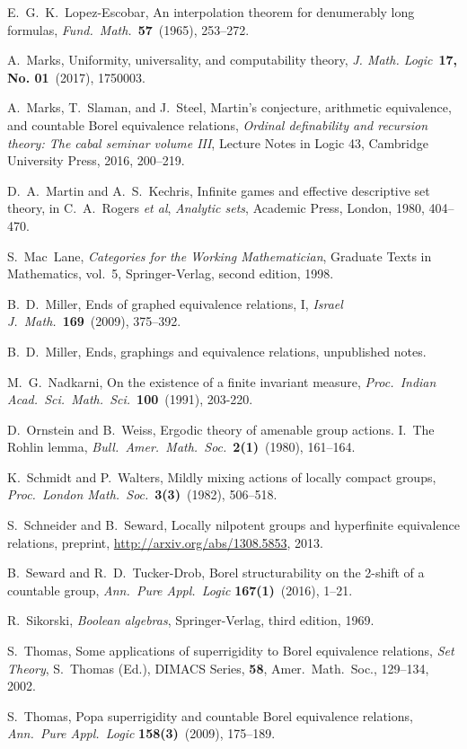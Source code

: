 \documentclass[11pt]{article}
\begin{document}
\begin{thebibliography}{00000}
  E.~G.~K.~Lopez-Escobar, An interpolation theorem for denumerably long formulas, \emph{Fund.\ Math.}\ \textbf{57}~(1965), 253--272.

  A.~Marks, Uniformity, universality, and computability theory, \emph{J. Math. Logic}\ \textbf{17, No. 01}~(2017), 1750003.


  A.~Marks, T.~Slaman, and J.~Steel, Martin's conjecture, arithmetic equivalence, and countable Borel equivalence relations, \emph{Ordinal definability and recursion theory: The cabal seminar volume III}, Lecture Notes in Logic 43, Cambridge University Press, 2016, 200--219.

  D.~A.~Martin and A.~S.~Kechris, Infinite games and effective descriptive set theory, in C.~A.~Rogers \emph{et al}, \emph{Analytic sets}, Academic Press, London, 1980, 404--470.

  S.~Mac~Lane, \emph{Categories for the Working Mathematician}, Graduate Texts in Mathematics, vol.~5, Springer-Verlag, second edition, 1998.

  B.~D.~Miller, Ends of graphed equivalence relations, I, \emph{Israel J.\ Math.}\ \textbf{169}~(2009), 375--392.

  B.~D.~Miller, Ends, graphings and equivalence relations, unpublished notes.

  M.~G.~Nadkarni, On the existence of a finite invariant measure, \emph{Proc.\ Indian Acad.\ Sci.\ Math.\ Sci.}\ \textbf{100}~(1991), 203-220.

  D.~Ornstein and B.~Weiss, Ergodic theory of amenable group actions.  I.\ The Rohlin lemma, \emph{Bull.\ Amer.\ Math.\ Soc.}\ \textbf{2(1)}~(1980), 161--164.

  K.~Schmidt and P.~Walters, Mildly mixing actions of locally compact groups, \emph{Proc.\ London Math.\ Soc.}\ \textbf{3(3)}~(1982), 506--518.

  S.~Schneider and B.~Seward, Locally nilpotent groups and hyperfinite equivalence relations, preprint, \url{http://arxiv.org/abs/1308.5853}, 2013.

  B.~Seward and R.~D.~Tucker-Drob, Borel structurability on the 2-shift of a countable group, \emph{Ann.\ Pure Appl.\ Logic} \textbf{167(1)}~(2016), 1--21.

  R.~Sikorski, \emph{Boolean algebras}, Springer-Verlag, third edition, 1969.

  S.~Thomas, Some applications of superrigidity to Borel equivalence relations, \emph{Set Theory}, S.~Thomas (Ed.), DIMACS Series, \textbf{58}, Amer.\ Math.\ Soc., 129--134, 2002.

  S.~Thomas, Popa superrigidity and countable Borel equivalence relations, \emph{Ann.\ Pure Appl.\ Logic} \textbf{158(3)}~(2009), 175--189.

\end{thebibliography}
\end{document}
